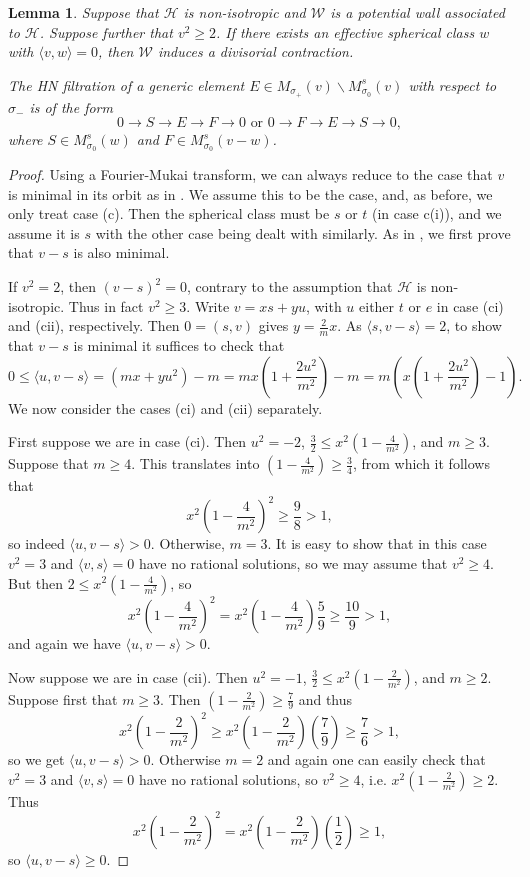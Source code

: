 \documentclass[leqno,11pt]{amsart}
\newtheorem{Lem}[Thm]{Lemma}
\theoremstyle{definition}
\def\HH{\ensuremath{\mathcal H}}
\def\WW{\ensuremath{\mathcal W}}
\begin{document}
\begin{Lem}
Suppose that $\HH$ is non-isotropic and $\WW$ is a potential wall associated to $\HH$.  Suppose further that $v^2\geq 2$.  If there exists an effective spherical class $w$ with $\langle v,w\rangle=0$, then $\WW$ induces a divisorial contraction.  

The HN filtration of a generic element $E\in M_{\sigma_+}(v)\backslash M^s_{\sigma_0}(v)$ with respect to $\sigma_-$ is of the form $$0\to S\to E\to F\to 0\mbox{ or }0\to F\to E\to S\to 0,$$ where $S\in M^s_{\sigma_0}(w)$ and $F\in M^s_{\sigma_0}(v-w)$.
\end{Lem}
\begin{proof}
Using a Fourier-Mukai transform, we can always reduce to the case that $v$ is minimal in its orbit as in \cite[Corollary 7.3, Lemma 7.5]{BM14b}.  We assume this to be the case, and, as before, we only treat case (c).  Then the spherical class must be $s$ or $t$ (in case c(i)), and we assume it is $s$ with the other case being  dealt with similarly.  As in \cite[Lemma 7.4]{BM14b}, we first prove that $v-s$ is also minimal.

If $v^2=2$, then $(v-s)^2=0$, contrary to the assumption that $\HH$ is non-isotropic.  Thus in fact $v^2\geq 3$.  Write $v=xs+yu$, with $u$ either $t$ or $e$ in case (ci) and (cii), respectively.  Then $0=(s,v)$ gives $y=\frac{2}{m}x$.  As $\langle s,v-s\rangle=2$, to show that $v-s$ is minimal it suffices to check that $$0\leq \langle u,v-s\rangle=(mx+yu^2)-m=mx(1+\frac{2u^2}{m^2})-m=m(x(1+\frac{2u^2}{m^2})-1).$$  We now consider the cases (ci) and (cii) separately. 

First suppose we are in case (ci).  Then $u^2=-2$, $\frac{3}{2}\leq x^2(1-\frac{4}{m^2})$, and $m\geq 3$.  Suppose that $m\geq 4$.  This translates into $(1-\frac{4}{m^2})\geq\frac{3}{4}$, from which it follows that $$x^2(1-\frac{4}{m^2})^2\geq\frac{9}{8}>1,$$ so indeed $\langle u,v-s\rangle>0$.  Otherwise, $m=3$.  It is easy to show that in this case $v^2=3$ and $\langle v,s\rangle=0$ have no rational solutions, so we may assume that $v^2\geq 4$.  But then $2\leq x^2(1-\frac{4}{m^2})$, so $$x^2(1-\frac{4}{m^2})^2=x^2(1-\frac{4}{m^2})\frac{5}{9}\geq\frac{10}{9}>1,$$ and again we have $\langle u,v-s\rangle>0$.

Now suppose we are in case (cii).  Then $u^2=-1$, $\frac{3}{2}\leq x^2(1-\frac{2}{m^2})$, and $m\geq 2$.  Suppose first that $m\geq 3$.  Then $(1-\frac{2}{m^2})\geq\frac{7}{9}$ and thus $$x^2(1-\frac{2}{m^2})^2\geq x^2(1-\frac{2}{m^2})(\frac{7}{9})\geq\frac{7}{6}>1,$$ so we get $\langle u,v-s\rangle>0$.  Otherwise $m=2$ and again one can easily check that $v^2=3$ and $\langle v,s\rangle =0$ have no rational solutions, so $v^2\geq 4$, i.e. $x^2(1-\frac{2}{m^2})\geq 2$.  Thus $$x^2(1-\frac{2}{m^2})^2=x^2(1-\frac{2}{m^2})(\frac{1}{2})\geq 1,$$ so $\langle u,v-s\rangle\geq 0$.


\end{proof}
\end{document}
